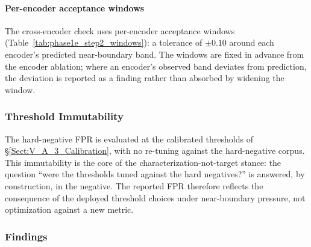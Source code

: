 \documentclass[journal]{IEEEtran}
\begin{document}
\paragraph{Per-encoder acceptance windows}
The cross-encoder check uses per-encoder acceptance windows (Table~\ref{tab:phase1e_step2_windows}): a tolerance of $\pm 0.10$ around each encoder's predicted near-boundary band. The windows are fixed in advance from the encoder ablation; where an encoder's observed band deviates from prediction, the deviation is reported as a finding rather than absorbed by widening the window.

\begin{table}[!t]
    \centering
    \caption{Per-encoder acceptance windows for the cross-encoder check. A tolerance of $\pm 0.10$ around each encoder's predicted near-boundary band yields the acceptance window.}
    \label{tab:phase1e_step2_windows}
\end{table}

\subsubsection{Threshold Immutability}
\label{Sect:V_C_5_Immutability}

The hard-negative FPR is evaluated at the calibrated thresholds of \S\ref{Sect:V_A_3_Calibration}, with no re-tuning against the hard-negative corpus. This immutability is the core of the characterization-not-target stance: the question ``were the thresholds tuned against the hard negatives?'' is answered, by construction, in the negative. The reported FPR therefore reflects the consequence of the deployed threshold choices under near-boundary pressure, not optimization against a new metric.

\subsubsection{Findings}
\label{Sect:V_C_6_Findings}
\end{document}
